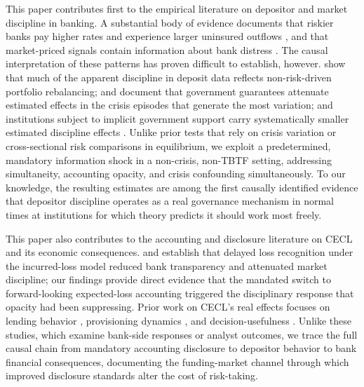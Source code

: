 This paper contributes first to the empirical literature on depositor and market
discipline in banking.  A substantial body of evidence documents that riskier
banks pay higher rates and experience larger uninsured outflows
\citep{park1995market, martinez2001depositors, maechler2006dynamic, egan2017deposit},
and that market-priced signals contain information about bank distress
\citep{flannery1996evidence, nier2006market}.  The causal interpretation of these
patterns has proven difficult to establish, however.  \citet{covitz2004market}
show that much of the apparent discipline in deposit data reflects non-risk-driven
portfolio rebalancing; \citet{bennett2015market} and \citet{berger2015depositors}
document that government guarantees attenuate estimated effects in the crisis
episodes that generate the most variation; and institutions subject to implicit
government support carry systematically smaller estimated discipline effects
\citep{jacewitz2018deposit}.  Unlike prior tests that rely on crisis variation or
cross-sectional risk comparisons in equilibrium, we exploit a predetermined,
mandatory information shock in a non-crisis, non-TBTF setting, addressing
simultaneity, accounting opacity, and crisis confounding simultaneously.  To our
knowledge, the resulting estimates are among the first causally identified evidence
that depositor discipline operates as a real governance mechanism in normal times
at institutions for which theory predicts it should work most freely.

This paper also contributes to the accounting and disclosure literature on CECL
and its economic consequences.  \citet{bushman2012accounting} and
\citet{bushman2015delayed} establish that delayed loss recognition under the
incurred-loss model reduced bank transparency and attenuated market discipline;
our findings provide direct evidence that the mandated switch to
forward-looking expected-loss accounting triggered the disciplinary response that
opacity had been suppressing.  Prior work on CECL's real effects focuses on
lending behavior \citep{granja2025current}, provisioning dynamics
\citep{kim2026current}, and decision-usefulness \citep{gee2022decision}.  Unlike
these studies, which examine bank-side responses or analyst outcomes, we trace the
full causal chain from mandatory accounting disclosure to depositor behavior to
bank financial consequences, documenting the funding-market channel through which
improved disclosure standards alter the cost of risk-taking.

